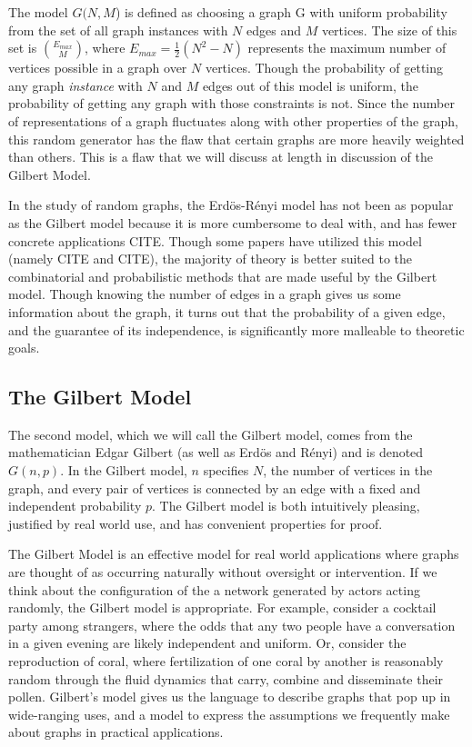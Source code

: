 \documentclass[11pt,a4paper]{report}
\begin{document}
The model $G(N, M$) is defined as choosing a graph G with uniform probability from the set of all graph instances with $N$ edges and $M$ vertices.
The size of this set is $\binom{E_{max}}{M}$, where $E_{max} = \frac{1}{2}(N^2 - N)$ represents the maximum number of vertices possible in a graph over $N$ vertices.
Though the probability of getting any graph \emph{instance} with $N$ and $M$ edges out of this model is uniform, the probability of getting any graph with those constraints is not.
Since the number of representations of a graph fluctuates along with other properties of the graph, this random generator has the flaw that certain graphs are more heavily weighted than others.
This is a flaw that we will discuss at length in discussion of the Gilbert Model.

In the study of random graphs, the Erd\"os-R\'enyi model has not been as popular as the Gilbert model because it is more cumbersome to deal with, and has fewer concrete applications CITE.
Though some papers have utilized this model (namely CITE and CITE), the majority of theory is better suited to the combinatorial and probabilistic methods that are made useful by the Gilbert model.
Though knowing the number of edges in a graph gives us some information about the graph, it turns out that the probability of a given edge, and the guarantee of its independence, is significantly more malleable to theoretic goals.

\subsection{The Gilbert Model}

The second model, which we will call the Gilbert model, comes from the mathematician Edgar Gilbert (as well as Erd\"os and R\'enyi) and is denoted $G(n, p)$.
In the Gilbert model, $n$ specifies $N$, the number of vertices in the graph, and every pair of vertices is connected by an edge with a fixed and independent probability $p$.
The Gilbert model is both intuitively pleasing, justified by real world use, and has convenient properties for proof.

The Gilbert Model is an effective model for real world applications where graphs are thought of as occurring naturally without oversight or intervention.
If we think about the configuration of the a network generated by actors acting randomly, the Gilbert model is appropriate.
For example, consider a cocktail party among strangers, where the odds that any two people have a conversation in a given evening are likely independent and uniform.
Or, consider the reproduction of coral, where fertilization of one coral by another is reasonably random through the fluid dynamics that carry, combine and disseminate their pollen.
Gilbert's model gives us the language to describe graphs that pop up in wide-ranging uses, and a model to express the assumptions we frequently make about graphs in practical applications.
\end{document}
